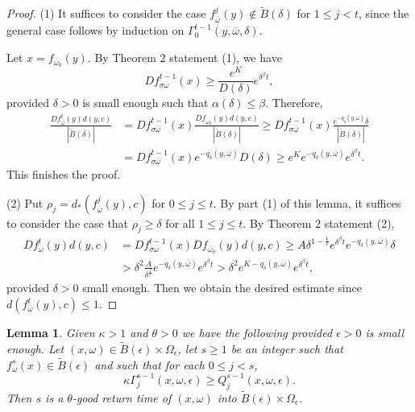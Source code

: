 \documentclass[11pt,oneside]{article}
\theoremstyle{plain}
\newtheorem{lem}{Lemma}[section]
\numberwithin{equation}{section}
\numberwithin{figure}{section}
\numberwithin{table}{section}
\begin{document}
\begin{proof}

(1) It suffices to consider the case $f_{\overline \omega}^j (y) \notin \tilde B(\delta)$ for $1 \leq j < t$, since the general case follows by induction on $\Gamma_0^{t-1}(y, \overline \omega, \delta)$. 


Let $x = f_{\overline \omega_0}(y)$. By Theorem 2 statement (1), we have
\[
D f_{\sigma \overline \omega}^{t-1}(x) \geq \frac{e^K}{D(\delta)} e^{\delta^{\beta} t},
\]
provided $\delta>0$ is small enough such that $\alpha(\delta) \leq \beta$. Therefore,
\begin{align*}
\frac{Df_{\overline \omega}^t (y) d(y, c) }{|\tilde B(\delta)|} &= D f_{\sigma \overline \omega}^{t-1}(x) \frac{Df_{\overline \omega_0} (y) d(y, c) }{|\tilde B(\delta)|} \geq D f_{\sigma \overline \omega}^{t-1}(x) \frac{e^{-q_{\delta} (y, \overline \omega)} \delta}{|\tilde B(\delta)|}  \\
& = D f_{\sigma \overline \omega}^{t-1}(x) e^{-q_{\delta} (y, \overline \omega)} D(\delta) \geq e^Ke^{-q_{\delta} (y, \overline \omega)} e^{\delta^{\beta} t}.
\end{align*}
This finishes the proof.


(2) Put $\rho_j = d_* (f_{\overline \omega}^j(y), c)$ for $0 \leq j \leq t$. By part (1) of this lemma, it suffices to consider the case that $\rho_j \geq \delta$ for all $1 \leq j \leq t$. By Theorem 2 statement (2), 
 \begin{align*}
 Df_{\overline \omega}^t (y) d(y, c)  & = D f_{\sigma \overline \omega}^{t-1}(x) Df_{\overline \omega_0} (y) d(y, c) \geq A \delta^{1 - \frac{1}{\ell}} e^{\delta^{\beta} t} e^{-q_{\delta} (y, \overline \omega)} \delta \\
 & > \delta^2 \frac{A}{ \delta^{ \frac{1}{\ell}}} e^{-q_{\delta} (y, \overline \omega)}e^{\delta^{\beta} t} > \delta^2 e^{K-q_{\delta} (y, \overline \omega)}e^{\delta^{\beta} t},
 \end{align*}
 provided $\delta > 0$ small enough. Then we obtain the desired estimate since $d(f_{\overline \omega}^t (y), c) \leq 1$.

\end{proof}


\begin{lem}
Given $\kappa > 1$ and $\theta > 0$ we have the following provided $\epsilon > 0$ is small enough. Let $(x, \omega) \in \tilde B(\epsilon) \times \Omega_{\epsilon}$, let $s \geq 1$ be an integer such that $f_{\omega}^s (x) \in \tilde B(\epsilon)$ and such that for each $0 \leq j < s$,
\[
\kappa \Gamma_j^{s-1}(x,  \omega, \epsilon) \geq Q_j^{s-1}(x, \omega, \epsilon).
\]
Then $s$ is a $\theta$-good return time of $(x, \omega)$ into $\tilde B(\epsilon) \times \Omega_{\epsilon}$.
\end{lem}
\end{document}

